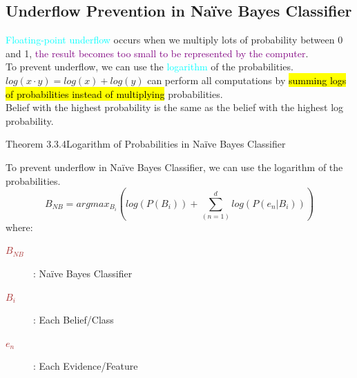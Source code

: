 \documentclass{book}
\begin{document}
\subsection{Underflow Prevention in Naïve Bayes Classifier}
\textcolor{cyan}{Floating-point underflow} occurs when we multiply lots of probability between 0 and 1, \textcolor{purple}{the result becomes too small to be represented by the computer}.\\
To prevent underflow, we can use the \textcolor{cyan}{logarithm} of the probabilities.\\
\(log(x \cdot y) = log(x) + log(y)\) can perform all computations by \hl{summing logs of probabilities instead of multiplying} probabilities.\\
Belief with the highest probability is the same as the belief with the highest log probability.\\
\begin{thmBox}{Theorem 3.3.4}{Logarithm of Probabilities in Naïve Bayes Classifier}
    \raggedright
    To prevent underflow in Naïve Bayes Classifier, we can use the logarithm of the probabilities.\\
    \[
        B_{NB} = argmax_{B_i} (log(P(B_i)) + \sum_(n=1)^d log(P(e_n|B_i)))
    \]
    where:
    \begin{description}
        \item[\textcolor{brown}{\(B_{NB}\)}]: Naïve Bayes Classifier
        \item[\textcolor{brown}{\(B_i\)}]: Each Belief/Class
        \item[\textcolor{brown}{\(e_n\)}]: Each Evidence/Feature
    \end{description}
\end{thmBox}
\\


\newpage
\end{document}
